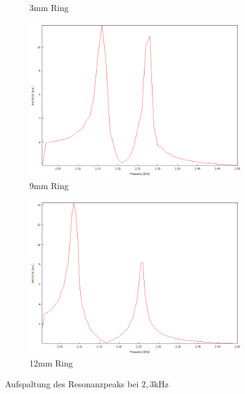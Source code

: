 \begin{figure}
\begin{subfigure}{0.4\textwidth}
    \caption{3mm Ring}
  \end{subfigure}
  \begin{subfigure}{0.4\textwidth}
    \centering
    \includegraphics[width=\textwidth]{Bilder/PC_Kugelresonator/180_2000-2500_9mmRing.png}
    \caption{9mm Ring}
  \end{subfigure}
  \begin{subfigure}{0.4\textwidth}
    \centering
    \includegraphics[width=\textwidth]{Bilder/PC_Kugelresonator/180_2000-2500_12mmRing.png}
    \caption{12mm Ring}
  \end{subfigure}
  \caption{Aufspaltung des Resonanzpeaks bei $2,3$kHz}
  \label{fig:kugel_ringe}
\end{figure}

